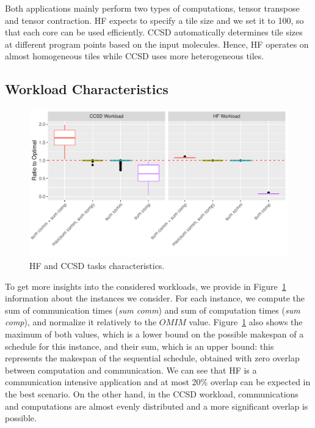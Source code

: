 \documentclass[sigconf]{acmart}
\begin{document}
{%
		Both applications mainly perform two types of computations, tensor transpose and tensor contraction. HF expects to specify a tile size and we set it to 100, so that each core can be used efficiently. CCSD automatically determines tile sizes at different program points based on the input molecules. Hence, HF operates on almost homogeneous tiles while CCSD uses more heterogeneous tiles.
		
		\subsection{Workload Characteristics}
		
		\begin{figure}[htb]
			\includegraphics[scale=0.5]{./results/plots/application_properties.pdf}
			\caption{HF and CCSD tasks characteristics.}
			\label{fig:ApplicationProperties}
		\end{figure}	
		
		To get more insights into the considered workloads, we provide in Figure~\ref{fig:ApplicationProperties} information about
		the instances we consider. For each instance, we compute the sum of communication times (\textit{sum comm}) and sum of computation times  (\textit{sum comp}), and normalize it relatively to the $OMIM$ value. Figure~\ref{fig:ApplicationProperties} also shows the maximum of both values, which is a lower bound on the possible makespan of a schedule for this instance, and their sum, which is an upper bound: this represents the makespan of the sequential schedule, obtained with zero overlap between computation and communication. We can see that HF is a communication intensive application and at most 20\% overlap can be expected in the best scenario. On the other hand, in the CCSD workload, communications and computations are almost evenly distributed and a more significant overlap is possible.
		
}
\end{document}
